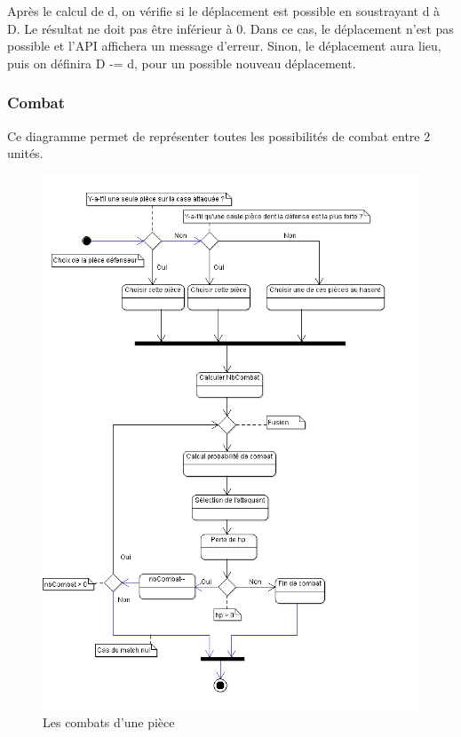Après le calcul de d, on vérifie si le déplacement est possible en soustrayant d à D. Le résultat ne doit pas être inférieur à 0. Dans ce cas, le déplacement n'est pas possible et l'API affichera un message d'erreur. Sinon, le déplacement aura lieu, puis on définira D -= d, pour un possible nouveau déplacement.

\subsubsection{Combat}
Ce diagramme permet de représenter toutes les possibilités de combat entre 2 unités. 

\begin{figure}[!h]
\centering
\includegraphics[width=1\textwidth]{img/Combat.png}
\caption{Les combats d'une pièce}
\end{figure}

